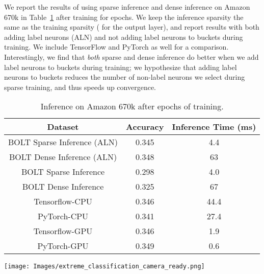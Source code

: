 \documentclass[sigconf]{acmart}
\begin{document}
We report the results of using sparse inference and dense inference on Amazon 670k in Table~\ref{table:sparse_inference} after training for  epochs. We keep the inference sparsity the same as the training sparsity ( for the output layer), and report results with both adding label neurons (ALN) and not adding label neurons to buckets during training. We include TensorFlow and PyTorch as well for a comparison. Interestingly, we find that \textit{both} sparse and dense inference do better when we add label neurons to buckets during training; we hypothesize that adding label neurons to buckets reduces the number of non-label neurons we select during sparse training, and thus speeds up convergence.

\begin{table}[h]
\begin{tabular}{ |c|c|c|}
 \hline
 Dataset & Accuracy & Inference Time (ms) \\ \hline
 BOLT Sparse Inference (ALN) & 0.345 & 4.4\\ \hline
 BOLT Dense Inference (ALN) & 0.348 & 63\\ \hline
 BOLT Sparse Inference & 0.298 & 4.0\\ \hline
 BOLT Dense Inference  & 0.325 & 67\\ \hline
 Tensorflow-CPU  & 0.346 & 44.4\\ \hline
 PyTorch-CPU & 0.341 & 27.4\\ \hline
 Tensorflow-GPU & 0.346 & 1.9\\ \hline
 PyTorch-GPU & 0.349 & 0.6 \\ \hline
\end{tabular}
\caption{\label{table:sparse_inference} Inference on Amazon 670k after  epochs of training.}
\vspace{-0.8cm}
\end{table}


\begin{figure*}[t]
    \texttt{[image: Images/extreme\_classification\_camera\_ready.png]}
    \vspace{-0.7cm}
    \caption{Precision@1 vs Time for the Amazon-670K, Wiki-350K, and Delicious 200K extreme classification recommendation benchmarks. Up and to the left is better. We observe that BOLT on a CPU tends to perform on par with TensorFlow and PyTorch models trained on a much more powerful A100 GPU. We also see that the advantages of BOLT emerge as we increase the number of output classes (right to left), which validates BOLT's strategy of sparsely computing activations.}
    \label{fig:extreme_classification}
\end{figure*}
\end{document}
